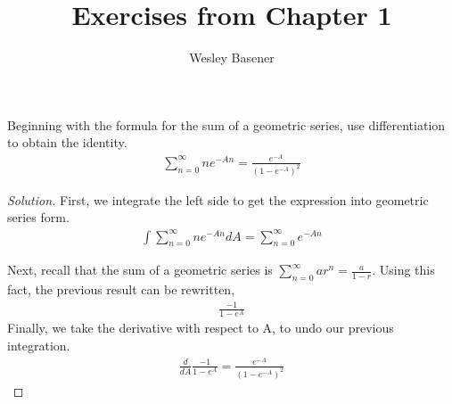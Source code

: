 \documentclass[10pt]{article}
\newenvironment{problem}[2][Problem]{\begin{trivlist}
		\item[\hskip \labelsep {\bfseries #1}\hskip \labelsep {\bfseries #2.}]}{\end{trivlist}}
\begin{document}
	
	\title{Exercises from Chapter 1}
	\author{Wesley Basener}
	\maketitle
	
	\begin{problem}{1.1}
		Beginning with the formula for the sum of a geometric series, use
		differentiation to obtain the identity.\\
		\begin{align*}
			\sum_{n=0}^{\infty}ne^{-An} = \frac{e^{-A}}{(1-e^{-A})^{2}} 
		\end{align*}
	\end{problem}
	
	
	
	\begin{proof}[Solution]
		First, we integrate the left side to get the expression into geometric series form. 
		\begin{align*}
			\int \sum_{n=0}^{\infty} ne^{-An} dA =  \sum_{n=0}^{\infty} e^{-An}
		\end{align*}
		
		Next, recall that the sum of a geometric series is $\sum_{n=0}^{\infty} ar^{n} = \frac{a}{1-r}$. Using this fact, the previous result can be rewritten,
		\begin{align*}
			\frac{-1}{1-e^{A}}
		\end{align*}
		Finally, we take the derivative with respect to A, to undo our previous integration.
		\begin{align*}
			\frac{d}{dA} \frac{-1}{1-e^{A}} =\frac{e^{-A}}{(1-e^{-A})^{2}}
			\end{align*}
	\end{proof}
	
	
\end{document}
